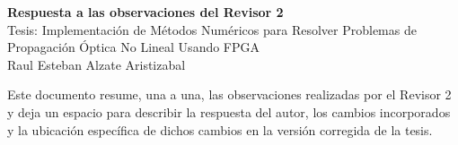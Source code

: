 \documentclass[11pt,letterpaper,landscape]{article}
\begin{document}
\begin{center}
  {\Large \textbf{Respuesta a las observaciones del Revisor 2}}\\
  \vspace{0.2em}
  {\large Tesis: Implementación de Métodos Numéricos para Resolver Problemas de Propagación Óptica No Lineal Usando FPGA}\\
  \vspace{0.2em}
  Raul Esteban Alzate Aristizabal
\end{center}

\vspace{0.5em}

Este documento resume, una a una, las observaciones realizadas por el Revisor 2 y deja un espacio para describir la respuesta del autor, los cambios incorporados y la ubicación específica de dichos cambios en la versión corregida de la tesis.
\end{document}
